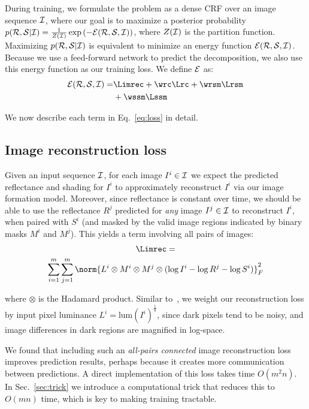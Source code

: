 \documentclass[10pt,twocolumn,letterpaper]{article}
\begin{document}
\medskip{}

During training, we formulate the problem as a dense CRF over an image
sequence $\mathcal{I}$, where our goal is to maximize a posterior
probability $p(\mathcal{R}, \mathcal{S} | \mathcal{I}) = \frac{1}{Z(\mathcal{I})}
  \exp\left( - \mathcal{E}(\mathcal{R}, \mathcal{S}, \mathcal{I})\right)$, where $Z(\mathcal{I})$ is the partition function. Maximizing $p(\mathcal{R}, \mathcal{S} | \mathcal{I})$ is equivalent to minimize an energy function $\mathcal{E}(\mathcal{R},
\mathcal{S}, \mathcal{I})$. Because we use a feed-forward network to predict
the decomposition, we also use this energy
function as our training loss. We define $\mathcal{E}$ as:
\begin{align}
  \Energy(\Reflectances, \Shadings, \Images) = & \Limrec + \wrc
  \Lrc + \wrsm \Lrsm  \nonumber \\ 
  & +  \wssm \Lssm  \label{eq:loss}
\end{align}

We now describe each term in Eq.~\ref{eq:loss} in detail.

\subsection{Image reconstruction loss}\label{sec:imrec}
Given an input sequence $\mathcal{I}$, for each image $I^i \in \mathcal{I}$ we
expect the predicted reflectance and shading for $I^i$ to
approximately reconstruct $I^i$ via our image formation
model. Moreover, since reflectance is constant over time, we should
be able to use the reflectance $R^j$ predicted for {\em any} image
$I^j\in \mathcal{I}$ to reconstruct $I^i$, when paired with $S^i$ (and
masked by the valid image regions indicated by binary masks $M^i$ and
$M^j$). This yields a term involving all pairs of images:
\small\begin{multline}
  \Limrec = \\
  \sum_{i=1}^{m} \sum_{j=1}^{m} \norm{L^i \otimes \Mask^i
    \otimes \Mask^j \otimes (\log I^i - \log R^j - \log S^i)}^2_F
\end{multline}\normalsize%

where $\otimes$ is the Hadamard
product. Similar to~\cite{chen2013simple}, we weight our
reconstruction loss by input pixel luminance $L^i =
\text{lum}(I^i)^{\frac{1}{8}}$, since dark pixels tend to be noisy,
and image differences in dark regions are magnified in log-space.

We found that including such an {\em all-pairs connected} image
reconstruction loss improves prediction results, perhaps because it
creates more communication between predictions. A direct
implementation of this loss takes time $O(m^2n)$. In
Sec.~\ref{sec:trick} we introduce a computational trick that reduces
this to $O(mn)$ time, which is key to making training tractable.
\end{document}

